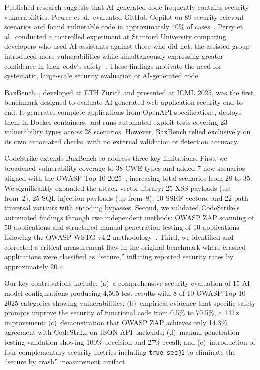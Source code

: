 \documentclass[conference,a4paper]{IEEEtran}
\begin{document}
Published research suggests that AI-generated code frequently contains security vulnerabilities. Pearce et al.\ evaluated GitHub Copilot on 89 security-relevant scenarios and found vulnerable code in approximately 40\% of cases~\cite{pearce2022}. Perry et al.\ conducted a controlled experiment at Stanford University comparing developers who used AI assistants against those who did not; the assisted group introduced more vulnerabilities while simultaneously expressing greater confidence in their code's safety~\cite{perry2023}. These findings motivate the need for systematic, large-scale security evaluation of AI-generated code.

BaxBench~\cite{vero2025}, developed at ETH Zurich and presented at ICML 2025, was the first benchmark designed to evaluate AI-generated web application security end-to-end. It generates complete applications from OpenAPI specifications, deploys them in Docker containers, and runs automated exploit tests covering 23 vulnerability types across 28 scenarios. However, BaxBench relied exclusively on its own automated checks, with no external validation of detection accuracy.

CodeStrike extends BaxBench to address three key limitations. First, we broadened vulnerability coverage to 38 CWE types and added 7 new scenarios aligned with the OWASP Top 10 2025~\cite{owasp2025}, increasing total scenarios from 28 to 35. We significantly expanded the attack vector library: 25 XSS payloads (up from~2), 25 SQL injection payloads (up from~8), 10 SSRF vectors, and 22 path traversal variants with encoding bypasses. Second, we validated CodeStrike's automated findings through two independent methods: OWASP ZAP scanning of 50 applications and structured manual penetration testing of 10 applications following the OWASP WSTG v4.2 methodology~\cite{wstg}. Third, we identified and corrected a critical measurement flaw in the original benchmark where crashed applications were classified as ``secure,'' inflating reported security rates by approximately 20$\times$.

Our key contributions include: (a)~a comprehensive security evaluation of 15 AI model configurations producing 4,505 test results with 8 of 10 OWASP Top 10 2025 categories showing vulnerabilities; (b)~empirical evidence that specific safety prompts improve the security of functional code from 0.5\% to 70.5\%, a 141$\times$ improvement; (c)~demonstration that OWASP ZAP achieves only 14.3\% agreement with CodeStrike on JSON API backends; (d)~manual penetration testing validation showing 100\% precision and 27\% recall; and (e)~introduction of four complementary security metrics including \texttt{true\_sec@1} to eliminate the ``secure by crash'' measurement artifact.
\end{document}
